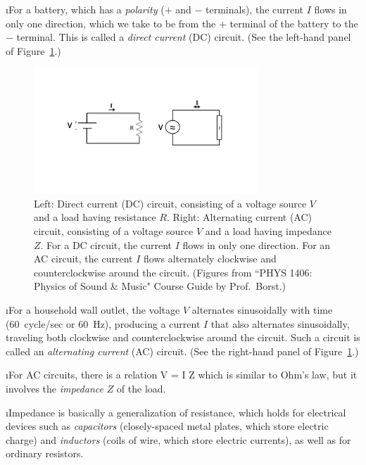 \i For a battery, which has a {\em polarity} ($+$ and 
$-$ terminals), the current $I$ flows in only one direction, 
which we take to be from the $+$ terminal of the battery 
to the $-$ terminal.
This is called a {\em direct current} (DC) circuit.
(See the left-hand panel of Figure~\ref{f:circuits_DC_AC}.)
%
\begin{figure}[htbp]
\begin{center}
\includegraphics[width=0.75\textwidth]{circuits_DC_AC}
\caption{Left: Direct current (DC) circuit, consisting
of a voltage source $V$ and a load having resistance $R$.
Right: Alternating current (AC) circuit, consisting of
a voltage source $V$ and a load having impedance $Z$.
For a DC circuit, the current $I$ flows in only one direction.
For an AC circuit, the current $I$ flows alternately clockwise and
counterclockwise around the circuit.
(Figures from ``PHYS 1406: Physics of Sound \& Music" 
Course Guide by Prof.~Borst.)}
\label{f:circuits_DC_AC}
\end{center}
\end{figure}

\i For a household wall outlet, the voltage $V$ alternates
sinusoidally with time (60~cycle/sec or 60~Hz), 
producing a current $I$ that 
also alternates sinusoidally, traveling both clockwise and 
counterclockwise around the circuit.
Such a circuit is called an {\em alternating current} (AC) circuit.
(See the right-hand panel of Figure~\ref{f:circuits_DC_AC}.)

\i For AC circuits, there is a relation 
%
\be
V = I Z
\ee
%
which is similar to Ohm's law, but it involves the {\em impedance}
$Z$ of the load.

\i Impedance is basically a generalization of resistance, which holds
for electrical devices such as {\em capacitors} (closely-spaced metal 
plates, which store electric charge) and {\em inductors} (coils of wire, 
which store electric currents), as well as for ordinary resistors.

